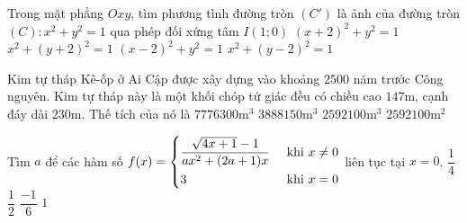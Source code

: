 \begin{ex}%
	Trong mặt phẳng $Oxy$, tìm phương tình đường tròn $(C')$ là ảnh của đường tròn $(C)\colon x^2 + y^2 =1$ qua phép đối xứng tâm $I\left(1;0\right)$
	\choice
	{$\left( x + 2 \right)^2 + y^2 = 1$}
	{$x^2 + \left( y + 2 \right)^2 = 1$}
	{\True $\left( x - 2 \right)^2 + y^2 = 1$}
	{$x^2 + \left( y - 2 \right)^2 = 1$}
\end{ex}
\begin{ex}%
	Kim tự tháp Kê-ốp ở Ai Cập được xây dựng vào khoảng $2500$ năm trước Công nguyên. Kim tự tháp này là một khối chóp tứ giác đều có chiều cao $147$m, cạnh đáy dài $230$m. Thế tích của nó là
	\choice
	{$7776300$m$^3$}
	{$3888150$m$^3$}
	{\True $2592100$m$^3$}
	{$2592100$m$^2$}
\end{ex}
\begin{ex}%
	Tìm $a$ để các hàm số $f(x) = \left\{\begin{aligned}&\dfrac{\sqrt{4x+1}-1}{ax^2+(2a+1)x} &\text{ khi } x \neq 0 \\ &3 &\text{ khi } x = 0 \end{aligned}\right.$ liên tục tại $x=0$.
	\choice
	{$\dfrac{1}{4}$}
	{$\dfrac{1}{2}$}
	{\True $\dfrac{-1}{6}$}
	{$1$}
\end{ex}

